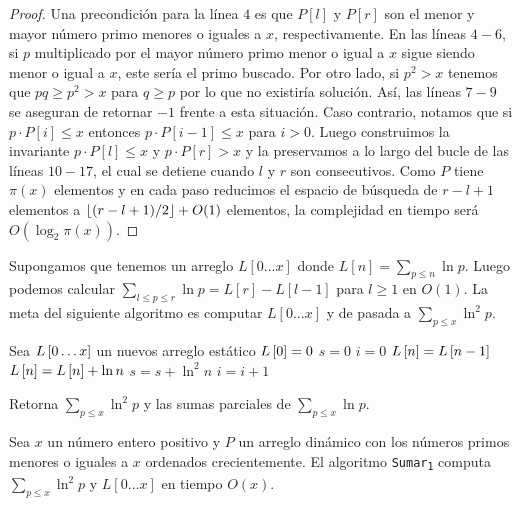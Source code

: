 \begin{proof}
    Una precondici\'on para la l\'inea \(4\) es que
    \(P[l]\) y \(P[r]\) son el menor y mayor n\'umero primo
    menores o iguales a \(x\), respectivamente.
    En las l\'ineas \(4-6\), si \(p\) multiplicado por el mayor n\'umero primo menor o igual a \(x\)
    sigue siendo menor o igual a \(x\), este ser\'ia el primo buscado.
    Por otro lado, si \(p^2 > x\) tenemos que \(pq \geq p^2 > x\) para \(q \geq p\)
    por lo que no existir\'ia soluci\'on.
    As\'i, las l\'ineas \(7-9\) se aseguran de retornar \(-1\) frente a esta situaci\'on.
    Caso contrario, notamos que si \(p \cdot P[i] \leq x\)
    entonces \(p \cdot P[i - 1] \leq x\) para \(i > 0\).
    Luego construimos la invariante \(p \cdot P[l] \leq x\) y \(p \cdot P[r] > x\)
    y la preservamos a lo largo del bucle de las l\'ineas \(10-17\),
    el cual se detiene cuando \(l\) y \(r\) son consecutivos.
    Como \(P\) tiene \(\pi(x)\) elementos y en cada paso
    reducimos el espacio de b\'usqueda de \(r - l + 1\) elementos
    a \(\left\lfloor (r - l + 1) / 2 \right\rfloor + O(1)\) elementos,
    la complejidad en tiempo ser\'a \(O(\log_2 \pi(x))\).
\end{proof}

Supongamos que tenemos un arreglo \(L[0 \dots x]\) donde
\(L[n] = \sum_{p \leq n} \ln p\).
Luego podemos calcular \(\sum_{l \leq p \leq r} \ln p = L[r] - L[l - 1]\) para \(l \geq 1\)
en \(O(1)\).
La meta del siguiente algoritmo es computar \(L[0 \dots x]\)
y de pasada a \(\sum_{p \leq x} \ln^2 p\).

\begin{algorithm}[H]
    \SetAlgoLined
    \DontPrintSemicolon
     {
        Sea \(L\left[ 0 \dots x \right]\) un nuevos arreglo est\'atico\;
        \(L\left[ 0 \right] = 0\)\;
        \(s = 0\)\;
        \(i = 0\)\;
         {
            \(L\left[ n \right] = L\left[ n - 1 \right]\)\;
             {
                \(L\left[ n \right] = L\left[ n \right] + \ln n\)\;
                \(s = s + \ln^2 n\)\;
                \(i = i + 1\)\;
            }
        }
    }
    \caption{Retorna \(\sum_{p \leq x} \ln^2 p\) y las sumas parciales de \(\sum_{p \leq x} \ln p\).}
\end{algorithm}

\begin{theorem}
    \label{thm:sum-1}
    Sea \(x\) un n\'umero entero positivo y
    \(P\) un arreglo din\'amico con los n\'umeros primos menores o iguales a \(x\) ordenados crecientemente.
    El algoritmo \texttt{Sumar\textsubscript{1}} computa \(\sum_{p \leq x} \ln^2 p\) y \(L[0 \dots x]\)
    en tiempo \(O(x)\).
\end{theorem}

